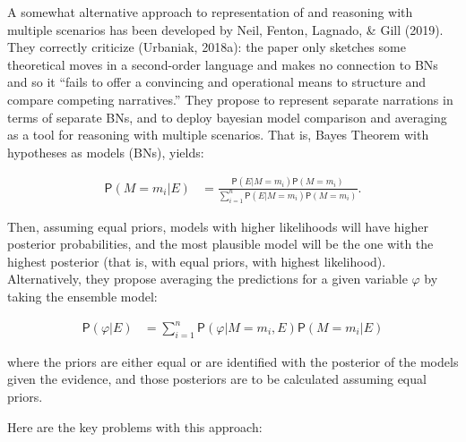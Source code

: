 \documentclass[11pt,dvipsnames,enabledeprecatedfontcommands]{scrartcl}
\newcommand{\pr}[1]{\mathsf{P}(#1)}
\begin{document}
A somewhat alternative approach to representation of and reasoning with
multiple scenarios has been developed by Neil, Fenton, Lagnado, \& Gill
(2019). They correctly criticize (Urbaniak, 2018a): the paper only
sketches some theoretical moves in a second-order language and makes no
connection to BNs and so it ``fails to offer a convincing and
operational means to structure and compare competing narratives.'' They
propose to represent separate narrations in terms of separate BNs, and
to deploy bayesian model comparison and averaging as a tool for
reasoning with multiple scenarios. That is, Bayes Theorem with
hypotheses as models (BNs), yields:

\vspace{-3mm}

\begin{align}
\pr{M=m_i\vert E} & = \frac{\pr{E\vert M = m_i}\pr{M= m_i}}
{\sum_{i=1}^{n}\pr{E \vert M = m_i}\pr{M = m_i}}.
\end{align}

\noindent Then, assuming equal priors, models with higher likelihoods
will have higher posterior probabilities, and the most plausible model
will be the one with the highest posterior (that is, with equal priors,
with highest likelihood). Alternatively, they propose averaging the
predictions for a given variable \(\varphi\) by taking the ensemble
model:

\vspace{-3mm}

\begin{align}
\pr{\varphi \vert E} & = \sum_{i=1}^n \pr{\varphi \vert M=m_i, E} \pr{M=m_i\vert E}
\end{align}

\vspace{-2mm}

\noindent where the priors are either equal or are identified with the
posterior of the models given the evidence, and those posteriors are to
be calculated assuming equal priors.

Here are the key problems with this approach:
\end{document}
